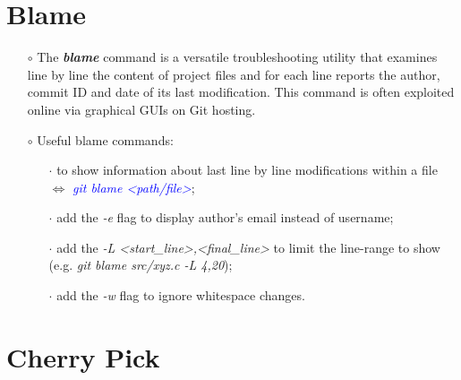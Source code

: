\documentclass[a4paper,portrait,10pt]{article}   %
\newcommand{\mybulletlvA}{$\circ$}   %
\newcommand{\mybulletlvB}{$\cdot$}   %
\newcommand{\mydiv}{$\Leftrightarrow$ }   %
\newcommand{\mycmd}[1]{\textcolor{blue}{\textit{#1}}}   %
\newcommand{\myparvspace}{\vspace{4mm}}   %
\newcommand{\mysecvspace}{\vspace{6mm}}   %
\begin{document}
\section{Blame}   \label{sec:Blame}

\begin{itemize}
\item[\mybulletlvA] The \textbf{\textit{blame}} command is a versatile troubleshooting utility that examines line by line the content of project files and for each line reports the author, commit ID and date of its last modification. This command is often exploited online via graphical GUIs on Git hosting.
\myparvspace

\item[\mybulletlvA] Useful blame commands:
\begin{itemize}
  \item[\mybulletlvB] to show information about last line by line modifications within a file \mydiv \mycmd{git blame <path/file>};
  \item[\mybulletlvB] add the \textit{-e} flag to display author's email instead of username;
  \item[\mybulletlvB] add the \textit{-L <start\_line>,<final\_line>} to limit the line-range to show (e.g. \textit{git blame src/xyz.c -L 4,20});
  \item[\mybulletlvB] add the \textit{-w} flag to ignore whitespace changes.
\end{itemize}
\end{itemize}
\mysecvspace


\section{Cherry Pick}   \label{sec:CherryPick}
\end{document}
